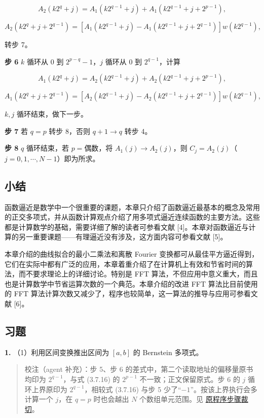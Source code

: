 \documentclass[
  10pt,
  fontset=fandol]{ctexart}
\begin{document}
\[
A_2(k2^q+j)=A_1(k2^{q-1}+j)+A_1(k2^{q-1}+j+2^{p-1}),
\]

\[
A_2(k2^q+j+2^{q-1})=[A_1(k2^{q-1}+j)-A_1(k2^{q-1}+j+2^{q-1})]w(k2^{q-1}),
\]

转步 7。

\textbf{步 6} \(k\) 循环从 \(0\) 到 \(2^{p-q}-1\)，\(j\) 循环从 \(0\) 到 \(2^{q-1}\)，计算

\[
A_1(k2^q+j)=A_2(k2^{q-1}+j)+A_2(k2^{q-1}+j+2^{p-1}),
\]

\[
A_1(k2^q+j+2^{q-1})=[A_2(k2^{q-1}+j)-A_2(k2^{q-1}+j+2^{q-1})]w(k2^{q-1}),
\]

\(k,j\) 循环结束，做下一步。

\textbf{步 7} 若 \(q=p\) 转步 8，否则 \(q+1\to q\) 转步 4。

\textbf{步 8} \(q\) 循环结束，若 \(p=\text{偶数}\)，将 \(A_1(j)\to A_2(j)\)，则 \(C_j=A_2(j)\)（\(j=0,1,\cdots,N-1\)）即为所求。

\subsection{小结}\label{ux5c0fux7ed3}

函数逼近是数学中一个很重要的课题，本章只介绍了函数逼近最基本的概念及常用的正交多项式，并从函数计算观点介绍了用多项式逼近连续函数的主要方法。这些都是计算数学的基础，需要详细了解的读者可参看文献 {[}4{]}。本章对函数逼近与计算的另一重要课题------有理逼近没有涉及，这方面内容可参看文献 {[}5{]}。

本章介绍的曲线拟合的最小二乘法和离散 Fourier 变换都可从最佳平方逼近得到，它们在实际中都有广泛的应用，本章着重介绍了在计算机上有效和节省时间的算法，而不要求理论上的详细讨论。特别是 FFT 算法，不但应用中意义重大，而且也是计算数学中节省运算次数的一个典范。本章介绍的改进 FFT 算法比目前使用的 FFT 算法计算次数又减少了，程序也较简单，这一算法的推导与应用可参看文献 {[}6{]}。

\subsection{习题}\label{ux4e60ux9898}

\textbf{1.} （1）利用区间变换推出区间为 \([a,b]\) 的 Bernstein 多项式。

\begin{quote}
校注（agent 补充）：步 5、步 6 的差式中，第二个读取地址的偏移量原书均印为 \(2^{q-1}\)，与式 (3.7.16) 的 \(2^{p-1}\) 不一致；正文保留原式。步 6 的 \(j\) 循环上界原印为 \(2^{q-1}\)，相较式 (3.7.16) 与步 5 少了``\(-1\)''。按该上界执行会多计算一个 \(j\)，在 \(q=p\) 时也会越出 \(N\) 个数组单元范围。见 \href{../assets/ch03b/p090-fft-steps.png}{原程序步骤裁切}。
\end{quote}
\end{document}

